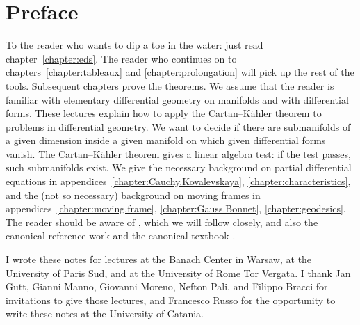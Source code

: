 \chapter*{Preface}
To the reader who wants to dip a toe in the water: just read chapter~\ref{chapter:eds}.
The reader who continues on to chapters~\ref{chapter:tableaux} and \ref{chapter:prolongation} will pick up the rest of the tools.
Subsequent chapters prove the theorems.
We assume that the reader is familiar with elementary differential geometry on manifolds and with differential forms.
These lectures explain how to apply the Cartan--K\"ahler theorem to problems in differential geometry.
We want to decide if there are submanifolds of a given dimension inside a given manifold on which given differential forms vanish.
The Cartan--K\"ahler theorem gives a linear algebra test: if the test passes, such submanifolds exist.
We give the necessary background on partial differential equations in appendices~\ref{chapter:Cauchy.Kovalevskaya}, \ref{chapter:characteristics}, and the (not so necessary) background on moving frames in appendices~\ref{chapter:moving.frame}, \ref{chapter:Gauss.Bonnet}, \ref{chapter:geodesics}.
The reader should be aware of \cite{Cartan:1945}, which we will follow closely, and also the canonical reference work \cite{BCGGG:1991} and the canonical textbook \cite{Ivey/Landsberg:2003}.

I wrote these notes for lectures at the Banach Center in Warsaw, at the University of Paris Sud, and at the University of Rome Tor Vergata.
I thank Jan Gutt, Gianni Manno, Giovanni Moreno, Nefton Pali, and Filippo Bracci for invitations to give those lectures, and Francesco Russo for the opportunity to write these notes at the University of Catania.
 
